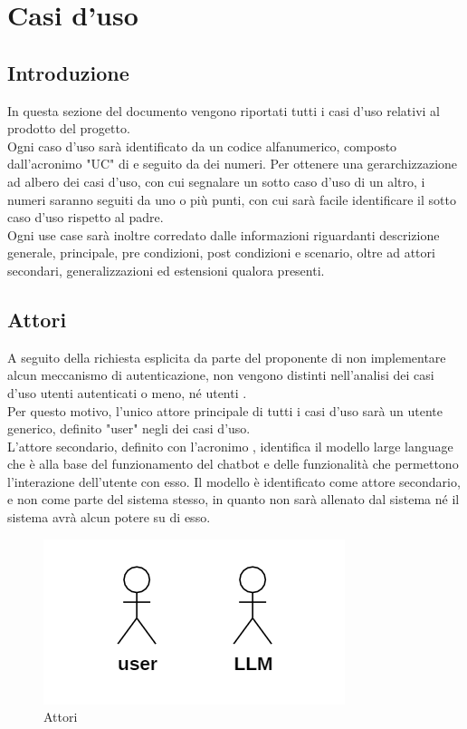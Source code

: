 \chapter{Casi d'uso}\label{sec:casi}
\section{Introduzione}
In questa sezione del documento vengono riportati tutti i casi d'uso relativi al prodotto del progetto.\\
Ogni caso d'uso sarà identificato da un codice alfanumerico, composto dall'acronimo "UC" di  e seguito da dei numeri. Per ottenere una gerarchizzazione ad albero dei casi d'uso, con cui segnalare un sotto caso d'uso di un altro, i numeri saranno seguiti da uno o più punti, con cui sarà facile identificare il sotto caso d'uso rispetto al padre.\\
Ogni use case sarà inoltre corredato dalle informazioni riguardanti descrizione generale,  principale, pre condizioni, post condizioni e scenario, oltre ad attori secondari, generalizzazioni ed estensioni qualora presenti.

\section{Attori}
A seguito della richiesta esplicita da parte del proponente di non implementare alcun meccanismo di autenticazione, non vengono distinti nell'analisi dei casi d'uso utenti autenticati o meno, né utenti .\\
Per questo motivo, l'unico attore principale di tutti i casi d'uso sarà un utente generico, definito "user" negli  dei casi d'uso.\\
L'attore secondario, definito con l'acronimo , identifica il modello large language che è alla base del funzionamento del chatbot e delle funzionalità che permettono l'interazione dell'utente con esso. Il modello è identificato come attore secondario, e non come parte del sistema stesso, in quanto non sarà allenato dal sistema né il sistema avrà alcun potere su di esso.

\begin{figure}[H]
    \centering
    \includegraphics[width=0.4\linewidth]{Attori.PNG}
    \caption{Attori}
    \label{fig:attori}
\end{figure}


